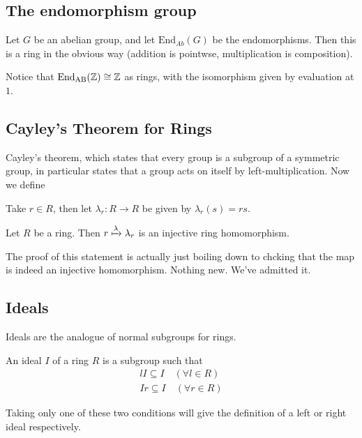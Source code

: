\documentclass[12pt, twosided]{article}
\begin{document}
\subsection{The endomorphism group}

Let \(G\) be an abelian group, and let \(\mathrm{End}_{Ab}(G)\) be the endomorphisms. Then this is a ring in the obvious way (addition is pointwse, multiplication is composition).

\begin{exa}
  Notice that \(\mathrm{End}_{\mathrm{AB}}(\mathbb{Z}) \cong \mathbb{Z}\) as rings, with the isomorphism given by evaluation at \(1\). 
\end{exa}

\subsection{Cayley's Theorem for Rings}

Cayley's theorem, which states that every group is a subgroup of a symmetric group, in particular states that a group acts on itself by left-multiplication. Now we define

\begin{df}
  Take \(r \in R\), then let \(\lambda_r:R \to R\) be given by \(\lambda_r(s) = rs\).
\end{df}

\begin{thm}
  Let \(R\) be a ring. Then \(r \xmapsto{\lambda} \lambda_r\) is an injective ring homomorphism.
\end{thm}

The proof of this statement is actually just boiling down to chcking that the map is indeed an injective homomorphism. Nothing new. We've admitted it.

\subsection{Ideals}
Ideals are the analogue of normal subgroups for rings.

\begin{df}
  An ideal \(I\) of a ring \(R\)  is a subgroup such that
  \begin{align*}
    lI \subseteq I \quad (\forall l \in R) \\
    Ir \subseteq I \quad (\forall r \in R)
  \end{align*}

  Taking only one of these two conditions will give the definition of a left or right ideal respectively.
\end{df}
\end{document}
